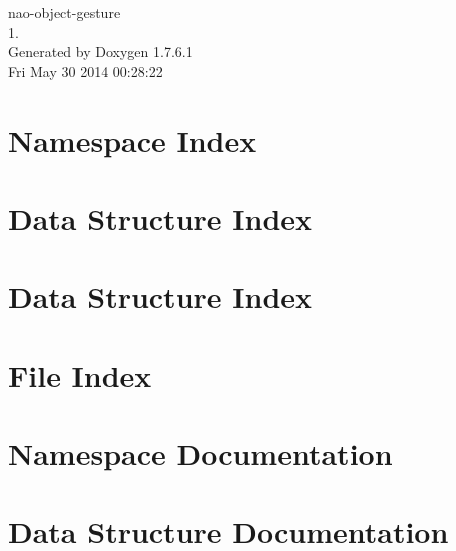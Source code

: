 \documentclass[a4paper]{book}
\begin{document}
\hypersetup{pageanchor=false,citecolor=blue}
\begin{titlepage}
\vspace*{7cm}
\begin{center}
{\Large nao-\/object-\/gesture \\[1ex]\large 1. }\\
\vspace*{1cm}
{\large \-Generated by Doxygen 1.7.6.1}\\
\vspace*{0.5cm}
{\small Fri May 30 2014 00:28:22}\\
\end{center}
\end{titlepage}
\clearemptydoublepage
{}
\tableofcontents
\clearemptydoublepage
{}
\hypersetup{pageanchor=true,citecolor=blue}
\chapter{\-Namespace \-Index}

\chapter{\-Data \-Structure \-Index}

\chapter{\-Data \-Structure \-Index}

\chapter{\-File \-Index}

\chapter{\-Namespace \-Documentation}

\chapter{\-Data \-Structure \-Documentation}























\end{document}
